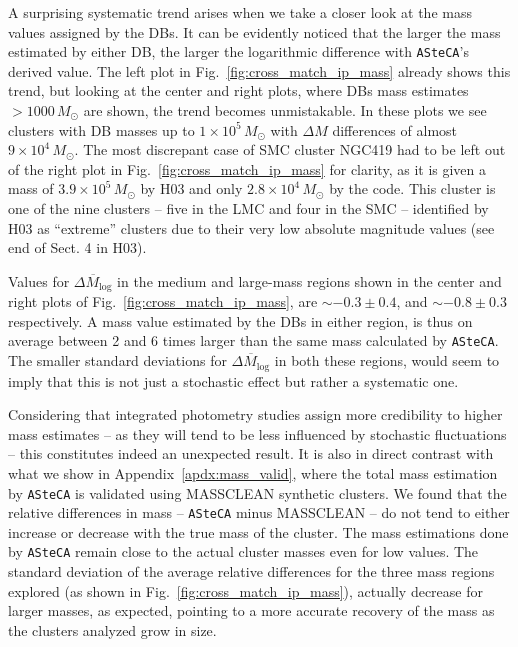 \documentclass{aa}
\begin{document}
A surprising systematic trend arises when we take a closer look at the mass
values assigned by the DBs. It can be evidently noticed that the larger the
mass estimated by either DB, the larger the logarithmic difference with 
\texttt{ASteCA}'s derived value. The left plot in
Fig.~\ref{fig:cross_match_ip_mass} already shows this trend, but looking
at the center and right plots, where DBs mass estimates ${>}1000\,M_{\odot}$ are
shown, the trend becomes unmistakable.
In these plots we see clusters with DB masses up to $1{\times}10^5\,M_{\odot}$
with $\Delta M$ differences of almost $9{\times}10^4\,M_{\odot}$.
The most discrepant case of SMC cluster NGC419 had to be left out of the right
plot in Fig.~\ref{fig:cross_match_ip_mass} for clarity, as it is given a mass of
$3.9{\times}10^5\,M_{\odot}$ by H03 and only $2.8{\times}10^4\,M_{\odot}$ by the
code. This cluster is one of the nine clusters -- five in the LMC and four in
the SMC -- identified by H03 as ``extreme'' clusters due to their very low
absolute magnitude values (see end of Sect. 4 in H03).

Values for $\overline{\Delta M_{\log}}$ in the medium and large-mass regions
shown in the center and right plots of Fig.~\ref{fig:cross_match_ip_mass}, are
${\sim-}0.3{\pm}0.4$, and ${\sim-}0.8{\pm}0.3$ respectively.
A mass value estimated by the DBs in either region, is thus on average between 2
and 6 times larger than the same mass calculated by \texttt{ASteCA}.
The smaller standard deviations for $\overline{\Delta M_{\log}}$ in both these
regions, would seem to imply that this is not just a stochastic effect but
rather a systematic one.

Considering that integrated photometry studies assign more credibility to higher
mass estimates -- as they will tend to be less influenced by stochastic
fluctuations -- this constitutes indeed an unexpected result.
%
It is also in direct contrast with what we show in
Appendix~\ref{apdx:mass_valid}, where the total mass estimation by
\texttt{ASteCA} is validated using MASSCLEAN synthetic clusters. We found that
the relative differences in mass -- \texttt{ASteCA} minus MASSCLEAN -- do not
tend to either increase or decrease with the true mass of the cluster. The mass
estimations done by \texttt{ASteCA} remain close to the actual cluster masses
even for low values. The standard deviation of the average relative differences
for the three mass regions explored (as shown in
Fig.~\ref{fig:cross_match_ip_mass}), actually decrease for larger masses, as
expected, pointing to a more accurate recovery of the mass as the clusters
analyzed grow in size.\\
\end{document}
